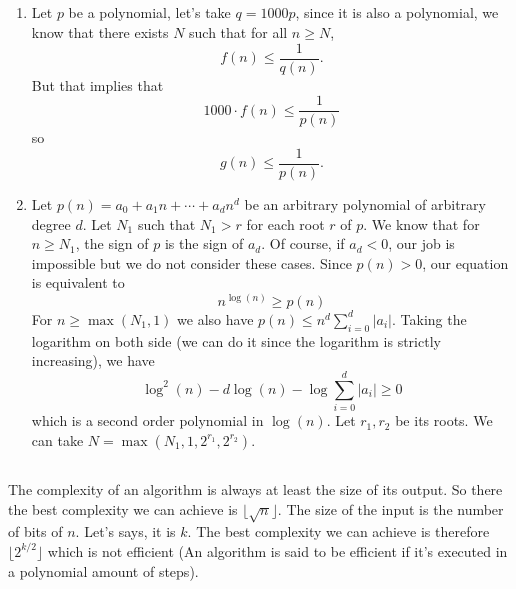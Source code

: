 \subsection{}
\begin{solution}
  \begin{enumerate}
    \item Let $p$ be a polynomial,
      let's take $q = 1000p$,
      since it is also a polynomial, we know
      that there exists $N$ such that for all $n \geq N$,
      \[ f(n) \leq \frac{1}{q(n)}. \]
      But that implies that
      \[ 1000 \cdot f(n) \leq \frac{1}{p(n)} \]
      so
      \[ g(n) \leq \frac{1}{p(n)}. \]
    \item Let $p(n) = a_0 + a_1 n + \cdots + a_dn^d$ be an
      arbitrary polynomial of arbitrary degree $d$.
      Let $N_1$ such that $N_1 > r$ for each root $r$ of $p$.
      We know that for $n \geq N_1$, the sign of $p$ is the sign of $a_d$.
      Of course, if $a_d < 0$, our job is impossible but we do not consider these cases.
      Since $p(n) > 0$, our equation is equivalent to
      \[ n^{\log(n)} \geq p(n) \]
      For $n \geq \max(N_1,1)$ we also have
      $p(n) \leq n^d \sum_{i=0}^d|a_i|$.
      Taking the logarithm on both side (we can do it since the logarithm is strictly increasing),
      we have
      \[ \log^2(n) - d \log(n) - \log\sum_{i=0}^d|a_i| \geq 0 \]
      which is a second order polynomial in $\log(n)$.
      Let $r_1,r_2$ be its roots.
      We can take $N = \max(N_1,1,2^{r_1},2^{r_2})$.
  \end{enumerate}
\end{solution}

\subsection{}
\begin{solution}
  The complexity of an algorithm is always at least
  the size of its output.
  So there the best complexity we can achieve is $\lfloor\sqrt{n}\rfloor$.
  The size of the input is the number of bits of $n$.
  Let's says, it is $k$.
  The best complexity we can achieve is therefore
  $\lfloor2^{k/2}\rfloor$ which is not efficient (An algorithm is said to be efficient if it's executed in a polynomial amount of steps).
\end{solution}

